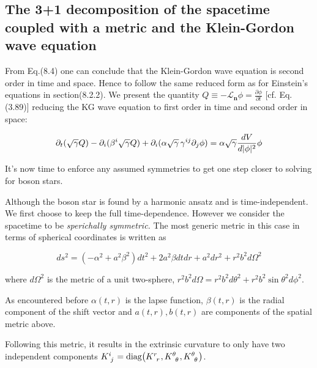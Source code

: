 \documentclass[12pt]{article}
\renewcommand{\vec}[1]{\bm{#1}}
\numberwithin{equation}{section}
\numberwithin{theorem}{subsection}
\begin{document}
\subsection{The 3+1 decomposition of the spacetime coupled with a metric and the Klein-Gordon wave equation}

\newline From Eq.(8.4) one can conclude that the Klein-Gordon wave equation is second order in time and space. Hence to follow the same reduced form as for Einstein's equations in section(8.2.2). We present the quantity $Q \equiv -\mathcal{L}_{\vec{n}}\phi = \frac{\partial \phi}{\partial t}$ [cf. Eq.(3.89)] reducing the KG wave equation to first order in time and second order in space:

\begin{equation}

    \partial_{t}(\sqrt{\gamma}Q) - \partial_{i}(\beta^{i} \sqrt{\gamma}Q) + \partial_{i}(\alpha \sqrt{\gamma}\,\tensor{\gamma}{^i^j}\partial_{j}\phi) = \alpha \sqrt{\gamma}\frac{dV}{d|\phi|^{2}}\phi

\end{equation}

It's now time to enforce any assumed symmetries to get one step closer to solving for boson stars.

Although the boson star is found by a harmonic ansatz and is time-independent. We first choose to keep the full time-dependence. However we consider the spacetime to be \textit{sperichally symmetric.} The most generic metric in this case in terms of spherical coordinates is written as

\begin{equation}

    \boxed{ds^{2} = (-\alpha^2+a^{2}\beta^{2})dt^{2} + 2a^{2}\beta dt dr + a^{2} dr^{2} + r^{2}b^{2} d\Omega^{2}}

\end{equation}

where $d\Omega^{2}$ is the metric of a unit two-sphere, $r^{2} b^{2}d\Omega = r^{2} b^{2}d\theta^{2} + r^{2} b^{2} \sin{\theta}^{2}d\phi^{2}$.

\newline As encountered before $\alpha(t,r)$ is the lapse function, $\beta(t,r)$ is the radial component of the shift vector and $a(t,r),b(t,r)$ are components of the spatial metric above.

Following this metric, it results in the extrinsic curvature to only have two independent components $\tensor{K}{^i_j} = \textrm{diag}\big(\tensor{K}{^r_r},\tensor{K}{^\theta_\theta},\tensor{K}{^\theta_\theta} \big)$. 
\end{document}
